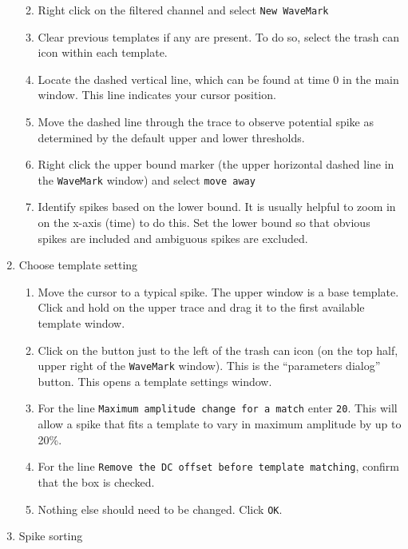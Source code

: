 \documentclass[
]{book}
\providecommand{\tightlist}{%
  \setlength{\itemsep}{0pt}\setlength{\parskip}{0pt}}
\begin{document}
\begin{enumerate}
  \begin{enumerate}
  \def\labelenumii{\arabic{enumii}.}
  \tightlist
  \item
    Right click on the filtered channel and select \texttt{New\ WaveMark}
  \item
    Clear previous templates if any are present. To do so, select the trash
    can icon within each template.
  \item
    Locate the dashed vertical line, which can be found at time 0 in the
    main window. This line indicates your cursor position.
  \item
    Move the dashed line through the trace to observe potential spike as
    determined by the default upper and lower thresholds.
  \item
    Right click the upper bound marker (the upper horizontal dashed line in
    the \texttt{WaveMark} window) and select \texttt{move\ away}
  \item
    Identify spikes based on the lower bound. It is usually helpful to zoom
    in on the x-axis (time) to do this. Set the lower bound so that obvious
    spikes are included and ambiguous spikes are excluded.
  \end{enumerate}
\item
  Choose template setting

  \begin{enumerate}
  \def\labelenumii{\arabic{enumii}.}
  \tightlist
  \item
    Move the cursor to a typical spike. The upper window is a base template.
    Click and hold on the upper trace and drag it to the first available
    template window.
  \item
    Click on the button just to the left of the trash can icon (on the top
    half, upper right of the \texttt{WaveMark} window). This is the ``parameters
    dialog'' button. This opens a template settings window.
  \item
    For the line \texttt{Maximum\ amplitude\ change\ for\ a\ match} enter \texttt{20}. This
    will allow a spike that fits a template to vary in maximum amplitude by
    up to 20\%.
  \item
    For the line \texttt{Remove\ the\ DC\ offset\ before\ template\ matching}, confirm
    that the box is checked.
  \item
    Nothing else should need to be changed. Click \texttt{OK}.
  \end{enumerate}
\item
  Spike sorting


\end{enumerate}
\end{document}
